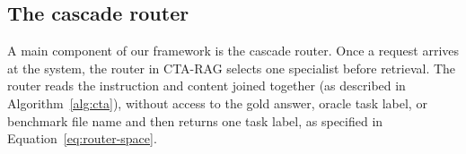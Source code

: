 \documentclass[5p,times,authoryear]{elsarticle}
\begin{document}




\subsection{The cascade router}\label{sec:router}
A main component of our framework is the cascade router. Once a request arrives at the system, the router in CTA-RAG selects one specialist before retrieval. The router reads the instruction and content joined together (as described in Algorithm~\ref{alg:cta}), without access to the gold answer, oracle task label, or benchmark file name and then returns one task label, as specified in Equation~\eqref{eq:router-space}.
\end{document}
